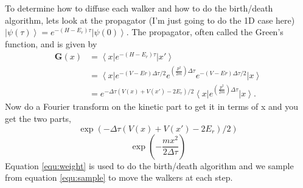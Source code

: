 To determine how to diffuse each walker and how to do the birth/death algorithm, lets look at the propagator (I'm just going to do the 1D case here) $\left| \psi(\tau) \right> = e^{-(H-E_r)\tau} \left| \psi(0) \right>$. The propagator, often called the Green's function, and is given by
\begin{equation}
  \begin{split}
    \mathbf{G}(x) &= \left<x\right| e^{-(H-E_r)\tau} \left|x'\right>\\
    &= \left<x\right| e^{-(V-Er)\Delta\tau/2} e^{(\frac{p^2}{2m})\Delta\tau} e^{-(V-Er)\Delta\tau/2} \left|x\right>\\
    &= e^{-\Delta\tau\left(V(x)+V(x')-2E_r\right)/2} \left<x\right| e^{(\frac{p^2}{2m})\Delta\tau} \left|x\right>.
  \end{split}
\end{equation}
Now do a Fourier transform on the kinetic part to get it in terms of x and you get the two parts,
\begin{equation}
  \exp{(-\Delta\tau\left(V(x)+V(x')-2E_r\right)/2)}
  \label{equ:weight}
\end{equation}
\begin{equation}
  \exp{(-\frac{mx^2}{2\Delta\tau})}
  \label{equ:sample}
\end{equation}
Equation \ref{equ:weight} is used to do the birth/death algorithm and we sample from equation \ref{equ:sample} to move the walkers at each step.

